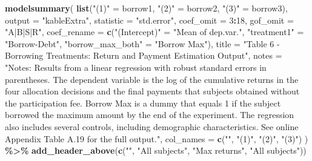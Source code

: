 \documentclass[
]{article}
\newenvironment{Shaded}{\begin{snugshade}}{\end{snugshade}}
\newcommand{\AttributeTok}[1]{\textcolor[rgb]{0.13,0.29,0.53}{#1}}
\newcommand{\DecValTok}[1]{\textcolor[rgb]{0.00,0.00,0.81}{#1}}
\newcommand{\FunctionTok}[1]{\textcolor[rgb]{0.13,0.29,0.53}{\textbf{#1}}}
\newcommand{\NormalTok}[1]{#1}
\newcommand{\OtherTok}[1]{\textcolor[rgb]{0.56,0.35,0.01}{#1}}
\newcommand{\SpecialCharTok}[1]{\textcolor[rgb]{0.81,0.36,0.00}{\textbf{#1}}}
\newcommand{\StringTok}[1]{\textcolor[rgb]{0.31,0.60,0.02}{#1}}
\begin{document}
\begin{Shaded}
\begin{Highlighting}[]
\FunctionTok{modelsummary}\NormalTok{(}
  \FunctionTok{list}\NormalTok{(}\StringTok{"(1)"} \OtherTok{=}\NormalTok{ borrow1, }\StringTok{"(2)"} \OtherTok{=}\NormalTok{ borrow2, }\StringTok{"(3)"} \OtherTok{=}\NormalTok{ borrow3), }
  \AttributeTok{output =} \StringTok{"kableExtra"}\NormalTok{,}
  \AttributeTok{statistic =} \StringTok{"std.error"}\NormalTok{,}
  \AttributeTok{coef\_omit =} \DecValTok{3}\SpecialCharTok{:}\DecValTok{18}\NormalTok{,}
  \AttributeTok{gof\_omit =} \StringTok{"A|B|S|R"}\NormalTok{,}
  \AttributeTok{coef\_rename =} \FunctionTok{c}\NormalTok{(}\StringTok{"(Intercept)"} \OtherTok{=} \StringTok{"Mean of dep.var."}\NormalTok{, }\StringTok{"treatment1"} \OtherTok{=} \StringTok{"Borrow{-}Debt"}\NormalTok{, }\StringTok{"borrow\_max\_both"} \OtherTok{=} \StringTok{"Borrow Max"}\NormalTok{),}
  \AttributeTok{title =} \StringTok{"Table 6 {-} Borrowing Treatments: Return and Payment Estimation Output"}\NormalTok{,}
  \AttributeTok{notes =} \StringTok{"Notes: Results from a linear regression with robust standard errors in parentheses. The dependent variable is the log of the cumulative returns in the four allocation decisions and the final payments that subjects obtained without the participation fee. Borrow Max is a dummy that equals 1 if the subject borrowed the maximum amount by the end of the experiment. The regression also includes several controls, including demographic characteristics. See online Appendix Table A.19 for the full output."}\NormalTok{,}
  \AttributeTok{col\_names =} \FunctionTok{c}\NormalTok{(}\StringTok{""}\NormalTok{, }\StringTok{"(1)"}\NormalTok{, }\StringTok{"(2)"}\NormalTok{, }\StringTok{"(3)"}\NormalTok{)}
\NormalTok{) }\SpecialCharTok{\%\textgreater{}\%}
  \FunctionTok{add\_header\_above}\NormalTok{(}\FunctionTok{c}\NormalTok{(}\StringTok{""}\NormalTok{, }\StringTok{"All subjects"}\NormalTok{, }\StringTok{"Max returns"}\NormalTok{, }\StringTok{"All subjects"}\NormalTok{))}
\end{Highlighting}
\end{Shaded}
\end{document}
